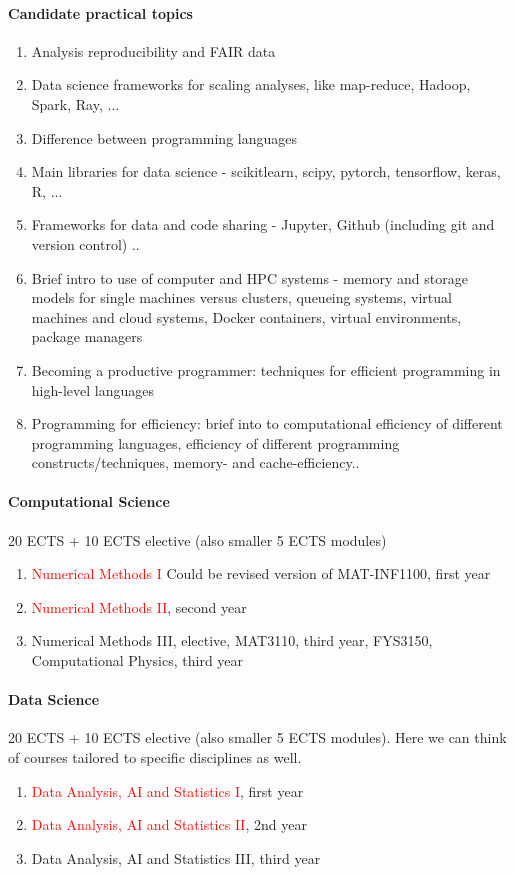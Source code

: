 \documentclass[oneside,final,10pt]{article}
\begin{document}
\paragraph{Candidate practical topics}
\begin{enumerate}
\item Analysis reproducibility and FAIR data
\item Data science frameworks for scaling analyses, like map-reduce, Hadoop, Spark, Ray, ...
\item Difference between programming languages
\item Main libraries for data science - scikitlearn, scipy, pytorch, tensorflow, keras, R, ...
\item Frameworks for data and code sharing - Jupyter, Github (including git and version control) ..
\item Brief intro to use of computer and HPC systems - memory and storage models for single machines versus clusters, queueing systems, virtual machines and cloud systems, Docker containers, virtual environments, package managers
\item Becoming a productive programmer: techniques for efficient programming in high-level languages 
\item Programming for efficiency: brief into to computational efficiency of different programming languages, efficiency of different programming constructs/techniques, memory- and cache-efficiency..
\end{enumerate}

\paragraph{Computational Science}
20 ECTS + 10 ECTS elective (also smaller 5 ECTS modules)
\begin{enumerate}
    \item \textcolor{red}{Numerical Methods I} Could be revised version of MAT-INF1100, first year
    \item \textcolor{red}{Numerical Methods II}, second year
    \item Numerical Methods III, elective, MAT3110, third year, FYS3150, Computational Physics, third year
\end{enumerate}

\paragraph{Data Science}
20 ECTS + 10 ECTS elective (also smaller 5 ECTS modules). Here we can think of courses tailored to specific disciplines as well. 
\begin{enumerate}
    \item \textcolor{red}{Data Analysis, AI and Statistics I}, first year
    \item \textcolor{red}{Data Analysis, AI and Statistics II}, 2nd year
    \item Data Analysis, AI and Statistics III, third year
\end{enumerate}
\end{document}
